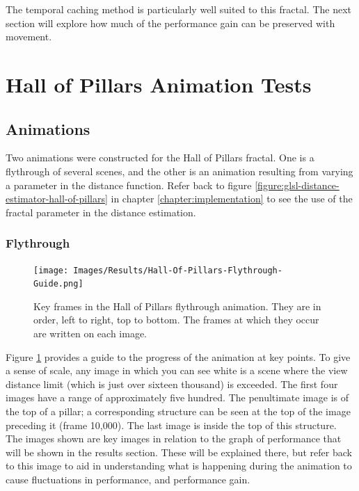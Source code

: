 The temporal caching method is particularly well suited to this fractal. The next section will explore how much of the performance gain can be preserved with movement.

\section{Hall of Pillars Animation Tests}

\subsection{Animations}

Two animations were constructed for the Hall of Pillars fractal. One is a flythrough of several scenes, and the other is an animation resulting from varying a parameter in the distance function. Refer back to figure \ref{figure:glsl-distance-estimator-hall-of-pillars} in chapter \ref{chapter:implementation} to see the use of the fractal parameter in the distance estimation.

\subsubsection{Flythrough}

\begin{figure}[ht]
	\centering
	\texttt{[image: Images/Results/Hall-Of-Pillars-Flythrough-Guide.png]}
	\caption{Key frames in the Hall of Pillars flythrough animation. They are in order, left to right, top to bottom. The frames at which they occur are written on each image.}
	\label{figure:hall-of-pillars-flythrough-guide}
\end{figure}

Figure \ref{figure:hall-of-pillars-flythrough-guide} provides a guide to the progress of the animation at key points. To give a sense of scale, any image in which you can see white is a scene where the view distance limit (which is just over sixteen thousand) is exceeded. The first four images have a range of approximately five hundred. The penultimate image is of the top of a pillar; a corresponding structure can be seen at the top of the image preceding it (frame 10,000). The last image is inside the top of this structure. The images shown are key images in relation to the graph of performance that will be shown in the results section. These will be explained there, but refer back to this image to aid in understanding what is happening during the animation to cause fluctuations in performance, and performance gain.

